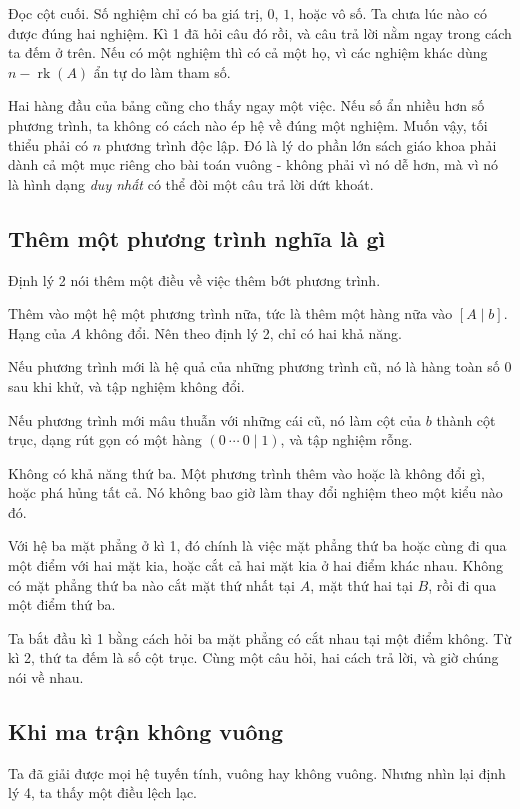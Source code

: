 \documentclass[12pt,a4paper]{article}
\begin{document}
Đọc cột cuối. Số nghiệm chỉ có ba giá trị, \(0\), \(1\), hoặc vô số. Ta chưa lúc nào có được đúng hai nghiệm. Kì 1 đã hỏi câu đó rồi, và câu trả lời nằm ngay trong cách ta đếm ở trên. Nếu có một nghiệm thì có cả một họ, vì các nghiệm khác dùng \(n-\operatorname{rk}(A)\) ẩn tự do làm tham số.

Hai hàng đầu của bảng cũng cho thấy ngay một việc. Nếu số ẩn nhiều hơn số phương trình, ta không có cách nào ép hệ về đúng một nghiệm. Muốn vậy, tối thiểu phải có \(n\) phương trình độc lập. Đó là lý do phần lớn sách giáo khoa phải dành cả một mục riêng cho bài toán vuông - không phải vì nó dễ hơn, mà vì nó là hình dạng \emph{duy nhất} có thể đòi một câu trả lời dứt khoát.

\subsection{Thêm một phương trình nghĩa là gì}

Định lý 2 nói thêm một điều về việc thêm bớt phương trình.

Thêm vào một hệ một phương trình nữa, tức là thêm một hàng nữa vào \([A\mid b]\). Hạng của \(A\) không đổi. Nên theo định lý 2, chỉ có hai khả năng.

Nếu phương trình mới là hệ quả của những phương trình cũ, nó là hàng toàn số \(0\) sau khi khử, và tập nghiệm không đổi.

Nếu phương trình mới mâu thuẫn với những cái cũ, nó làm cột của \(b\) thành cột trục, dạng rút gọn có một hàng \((0\ \cdots\ 0\mid 1)\), và tập nghiệm rỗng.

Không có khả năng thứ ba. Một phương trình thêm vào hoặc là không đổi gì, hoặc phá hủng tất cả. Nó không bao giờ làm thay đổi nghiệm theo một kiểu nào đó.

Với hệ ba mặt phẳng ở kì 1, đó chính là việc mặt phẳng thứ ba hoặc cùng đi qua một điểm với hai mặt kia, hoặc cắt cả hai mặt kia ở hai điểm khác nhau. Không có mặt phẳng thứ ba nào cắt mặt thứ nhất tại \(A\), mặt thứ hai tại \(B\), rồi đi qua một điểm thứ ba.

Ta bắt đầu kì 1 bằng cách hỏi ba mặt phẳng có cắt nhau tại một điểm không. Từ kì 2, thứ ta đếm là số cột trục. Cùng một câu hỏi, hai cách trả lời, và giờ chúng nói về nhau.

\subsection{Khi ma trận không vuông}

Ta đã giải được mọi hệ tuyến tính, vuông hay không vuông. Nhưng nhìn lại định lý 4, ta thấy một điều lệch lạc.
\end{document}
